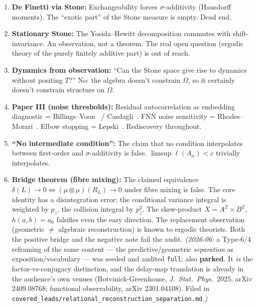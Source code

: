 \begin{enumerate}
  \item \textbf{De Finetti via Stone:} Exchangeability forces
    $\sigma$-additivity (Hausdorff moments).  The ``exotic part''
    of the Stone measure is empty.  Dead end.

  \item \textbf{Stationary Stone:} The Yosida--Hewitt decomposition
    commutes with shift-invariance.  An observation, not a theorem.
    The real open question (ergodic theory of the purely finitely
    additive part) is out of reach.

  \item \textbf{Dynamics from observation:} ``Can the Stone space
    give rise to dynamics without positing $T$?''  No: the algebra
    doesn't constrain $\Omega$, so it certainly doesn't constrain
    structure on $\Omega$.

  \item \textbf{Paper III (noise thresholds):} Residual
    autocorrelation as embedding diagnostic =
    Billings--Voon~\cite{BillingsVoon1986} /
    Casdagli~\cite{Casdagli1992}.  FNN noise sensitivity =
    Rhodes--Morari~\cite{RhodesMorari1997}.  Elbow stopping =
    Lepski~\cite{Lepski1991}.  Rediscovery throughout.

  \item \textbf{``No intermediate condition'':} The claim that
    no condition interpolates between first-order and
    $\sigma$-additivity is false.
    $\limsup \ell(A_n) < c$ trivially interpolates.

  \item \textbf{Bridge theorem (fibre mixing):} The claimed
    equivalence $\delta(L) \to 0 \Leftrightarrow
    (\mu \otimes \mu)(R_L) \to 0$ under fibre mixing is false.
    The core identity has a disintegration error: the conditional
    variance integral is weighted by $p_z$, the collision integral
    by $p_z^2$.  The skew-product $X = A^{\mathbb{Z}} \times
    B^{\mathbb{Z}}$, $h(a,b) = a_0$ falsifies even the easy
    direction.  The replacement observation (geometric $\neq$
    algebraic reconstruction) is known to ergodic theorists.
    Both the positive bridge and the negative note fail the audit.
    \emph{(2026-06:} a Type-6/4 reframing of the same content ---
    the predictive/geometric \emph{separation} as exposition/vocabulary
    --- was seeded and audited \texttt{full}; also \textbf{parked}.  It
    \emph{is} the factor-vs-conjugacy distinction, and the delay-map
    translation is already in the audience's own venues
    (Botvinick-Greenhouse, \emph{J.\ Stat.\ Phys.}\ 2025, arXiv
    2409.08768; functional observability, arXiv 2301.04108).  Filed in
    \texttt{covered\_leads/relational\_reconstruction\_separation.md}.\emph{)}


\end{enumerate}
